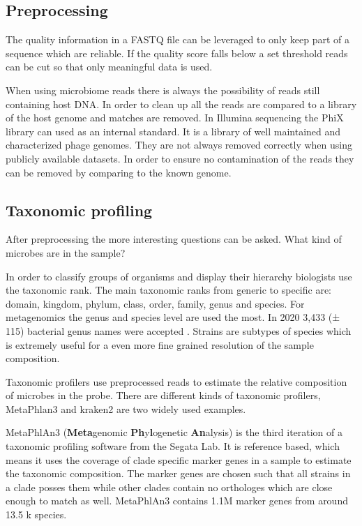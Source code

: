 	\subsection{Preprocessing}
The quality information in a FASTQ file can be leveraged to only keep part of a sequence which are reliable. If the quality score falls below a set threshold reads can be cut so that only meaningful data is used.

When using microbiome reads there is always the possibility of reads still containing host DNA. In order to clean up all the reads are compared to a library of the host genome and matches are removed.
In Illumina sequencing the PhiX library can used as an internal standard. It is a library of well maintained and characterized phage genomes. They are not always removed correctly when using publicly available datasets. In order to ensure no contamination of the reads they can be removed by comparing to the known genome. 

	\subsection{Taxonomic profiling}
After preprocessing the more interesting questions can be asked. What kind of microbes are in the sample?

In order to classify groups of organisms and display their hierarchy biologists use the taxonomic rank. The main taxonomic ranks from generic to specific are: domain, kingdom, phylum, class, order, family, genus and species. For metagenomics the genus and species level are used the most. 
In 2020 3,433 (± 115) bacterial genus names were accepted \citep{genus}.
Strains are subtypes of species which is extremely useful for a even more fine grained resolution of the sample composition.

Taxonomic profilers use preprocessed reads to estimate the relative composition of microbes in the probe.
There are different kinds of taxonomic profilers, MetaPhlan3 and kraken2 are two widely used examples. 

MetaPhlAn3 (\textbf{Meta}genomic \textbf{Ph}y\textbf{l}ogenetic \textbf{An}alysis) is the third iteration of a taxonomic profiling software from the Segata Lab. It is reference based, which means it uses the coverage of clade specific marker genes in a sample to estimate the taxonomic composition.
The marker genes are chosen such that all strains in a clade posses them while other clades contain no orthologes which are close enough to match as well. \citep{mpa3}
MetaPhlAn3 contains 1.1M marker genes from around 13.5 k species.

